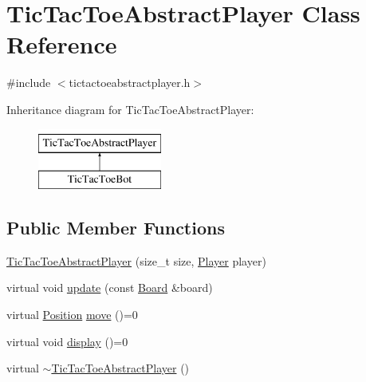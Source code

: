 \hypertarget{class_tic_tac_toe_abstract_player}{}\section{Tic\+Tac\+Toe\+Abstract\+Player Class Reference}
\label{class_tic_tac_toe_abstract_player}


{\ttfamily \#include $<$tictactoeabstractplayer.\+h$>$}

Inheritance diagram for Tic\+Tac\+Toe\+Abstract\+Player\+:\begin{figure}[H]
\begin{center}
\leavevmode
\includegraphics[height=2.000000cm]{class_tic_tac_toe_abstract_player}
\end{center}
\end{figure}
\subsection*{Public Member Functions}
\begin{DoxyCompactItemize}
\item 
\hyperlink{class_tic_tac_toe_abstract_player_a4a6df021e0dd3fa1e9a44fc7d9a4156a}{Tic\+Tac\+Toe\+Abstract\+Player} (size\+\_\+t size, \hyperlink{common__defs_8h_a9c8780378078e51e7c9041cbac392db9}{Player} player)
\item 
virtual void \hyperlink{class_tic_tac_toe_abstract_player_a0c307236b6413d44d2489f24ef85507a}{update} (const \hyperlink{common__defs_8h_a0dc5e1c0d1c3d4b1e210c805de5ca27b}{Board} \&board)
\item 
virtual \hyperlink{common__defs_8h_af9623b96ea87eb8f2d0fe97e45b0f79a}{Position} \hyperlink{class_tic_tac_toe_abstract_player_afccee4c01b399ecb12efc950474b6924}{move} ()=0
\item 
virtual void \hyperlink{class_tic_tac_toe_abstract_player_a4c36b375285f4d1511a11de121d0e5dc}{display} ()=0
\item 
virtual \hyperlink{class_tic_tac_toe_abstract_player_a5dbbe0fb30cd3acbae13d9a895b9bcd1}{$\sim$\+Tic\+Tac\+Toe\+Abstract\+Player} ()
\end{DoxyCompactItemize}
